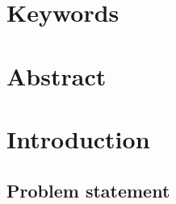 \documentclass[a4paper]{article} %
\title{\Title}%
\author[1,2]{\AuthorA }%
\author[2]{\AuthorB }
\author[2]{\AuthorC }
\affil[1]{\Address}
\affil[2]{\AddressBis}
\date{}
\begin{document}
%
\maketitle%
\section*{Keywords}%
\Keywords
\section*{Abstract}
\Abstract %
\section{Introduction}%
\subsection{Problem statement}%
\end{document}
